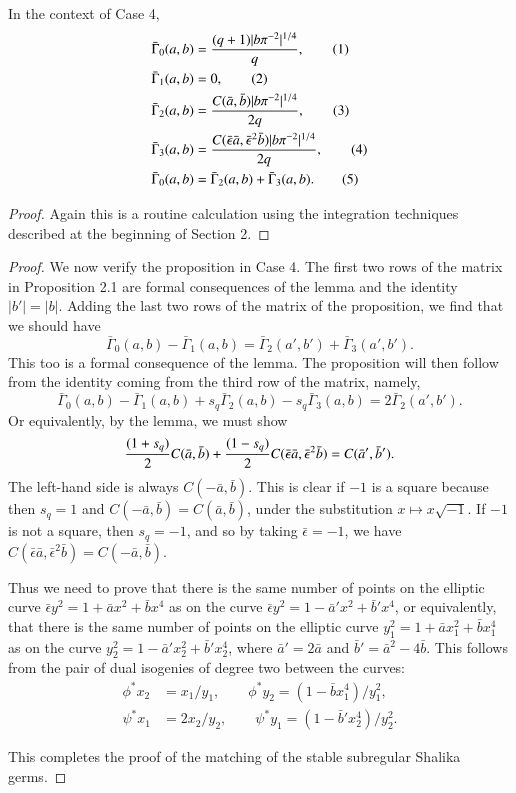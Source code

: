 \documentclass{amsart}
\newcommand\bGamma{\bar\Gamma}
\newenvironment{cthm}[1]
  {\renewcommand\thethm{\sc #1}\thm}
  {\endthm}
\begin{document}
\smallskip
\noindent
\begin{cthm}{Lemma 2.8} In the context of Case 4,
\begin{align*}
\bGamma_0(a,b) &= {(q+1)|b\pi^{-2}|^{1/4} \over q},\tag{1} \\
\bGamma_1(a,b) &= 0,\tag{2}\\
\bGamma_2(a,b) &= {C(\bar a,\bar b)|b\pi^{-2}|^{1/4} \over 2q},\tag{3} \\
\bGamma_3(a,b) &= {C(\bar \epsilon\bar a,\bar\epsilon^2
 			\bar b)|b\pi^{-2}|^{1/4} \over 2q},\tag{4} \\
\bGamma_0(a,b) &= \bGamma_2(a,b)+\bGamma_3(a,b).\tag{5}
\end{align*}
\end{cthm}

\smallskip
\noindent
\begin{proof}
Again this is a routine calculation using the integration techniques
described at the beginning of Section 2.
\end{proof}

\begin{proof}
We now verify the proposition in Case 4.
The first two rows of the matrix
in Proposition 2.1 are formal consequences of the lemma
and the identity $|b'|=|b|$.  Adding the last
two rows of the matrix of the proposition, 
we find that we should have
$$\bGamma_0(a,b) -\bGamma_1(a,b) = \bGamma_2(a',b') +\bGamma_3(a',b').$$
This too is a formal consequence of the lemma.
The proposition will then follow from the identity coming
from the third row of the matrix, namely,
$$\bGamma_0(a,b) -\bGamma_1(a,b) + s_q\bGamma_2(a,b) - s_q\bGamma_3(a,b)
	= 2\bGamma_2(a',b').$$
Or equivalently, by the lemma, we must show
$$
{(1+s_q)\over 2} C(\bar a,\bar b) + {(1-s_q)\over 2} C(\bar \epsilon 
\bar a,\bar \epsilon^2\bar b) = C(\bar a',\bar b').$$
The left-hand side is always $C(-\bar a,\bar b)$.  This is clear
if $-1$ is a square because then $s_q=1$ and $C(-\bar a,\bar b)=
C(\bar a,\bar b)$, under the substitution $x\mapsto x\sqrt{-1}$.
If $-1$ is not a square, then $s_q=-1$, and so by taking $\bar\epsilon=-1$,
we have $C(\bar\epsilon\bar a,\bar\epsilon^2\bar b) = C(-\bar a,\bar b)$.

Thus we need to prove that there is the same number of points
on the elliptic curve $\bar\epsilon y^2= 1+\bar a x^2 + \bar b x^4$ as
on the curve $\bar \epsilon y^2 = 1-\bar a'x^2 + \bar b' x^4$,
or equivalently, that there is the same number of points on the
elliptic curve $y_1^2 = 1+\bar a x_1^2 + \bar b x_1^4$ as on the
curve $y_2^2 = 1 - \bar a' x_2^2 + \bar b' x_2^4$, where $\bar a'=2\bar a$
and $\bar b' = \bar a^2 - 4\bar b$.  This follows from the pair
of dual isogenies of degree two between the curves:
\begin{align*}
\phi^*x_2 &= x_1/y_1,\qquad \phi^* y_2 = (1-\bar b x_1^4)/y_1^2,\\
\psi^*x_1 &= 2x_2/y_2,\qquad \psi^*y_1 = (1-\bar b' x_2^4)/y_2^2.
\end{align*}

This completes the proof of the matching of the stable subregular Shalika
germs.\end{proof}
\end{document}

